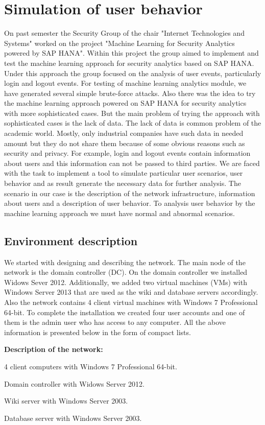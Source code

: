 \section{Simulation of user behavior}
On past semester the Security Group of the chair "Internet Technologies and Systems" worked on the project "Machine Learning for Security Analytics powered by SAP HANA". Within this project the group aimed to implement and test the machine learning approach for security analytics based on SAP HANA. Under this approach the group focused on the analysis of user events, particularly login and logout events. For testing of machine learning analytics module, we have generated several simple brute-force attacks. Also there was the idea to try the machine learning approach powered on SAP HANA for security analytics with more sophisticated cases. But the main problem of trying the approach with sophisticated cases is the lack of data. The lack of data is common problem of the academic world. Mostly, only industrial companies have such data in needed amount but they do not share them because of some obvious reasons such as security and privacy. For example, login and logout events contain information about users and this information can not be passed to third parties. We are faced with the task to implement a tool to simulate particular user scenarios, user behavior and as result generate the necessary data for further analysis.
The scenario in our case is the description of the network infrastructure, information about users and a description of user behavior. To analysis user behavior by the machine learning approach we must have normal and abnormal scenarios.  
  
\subsection{Environment description}
We started with designing and describing the network. The main node of the network is the domain controller (DC). On the domain controller we installed Widows Sever 2012. Additionally, we added two virtual machines (VMs) with Windows Server 2013 that are used as the wiki and database servers accordingly. Also the network contains 4 client virtual machines with Windows 7 Professional 64-bit. To complete the installation we created four user accounts and one of them is the admin user who has access to any computer. All the above information is presented below in the form of compact lists.

\begin{compactitem}
\item [\textbf{Description of the network:}]
\item 4 client computers with Windows 7 Professional 64-bit.
\item Domain controller with Widows Server 2012.
\item Wiki server with Windows Server 2003.
\item Database server with Windows Server 2003.
\end{compactitem}

